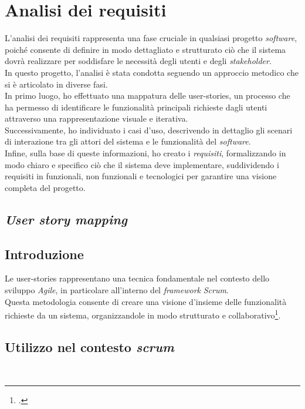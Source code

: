 \pagebreak
\section{Analisi dei requisiti}
\label{sez:analisi-dei-requisiti}
L’analisi dei requisiti rappresenta una fase cruciale in qualsiasi progetto \textit{software}, poiché consente di definire in modo dettagliato e strutturato ciò che il sistema dovrà realizzare per soddisfare le necessità degli utenti e degli \textit{stakeholder}.\\
In questo progetto, l’analisi è stata condotta seguendo un approccio metodico che si è articolato in diverse fasi.\\

\noindent In primo luogo, ho effettuato una mappatura delle \gls{user-stories}, un processo che ha permesso di identificare le funzionalità principali richieste dagli utenti attraverso una rappresentazione visuale e iterativa. \\
Successivamente, ho individuato i casi d’uso, descrivendo in dettaglio gli scenari di interazione tra gli attori del sistema e le funzionalità del \textit{software}.\\
Infine, sulla base di queste informazioni, ho creato i \textit{requisiti}, formalizzando in modo chiaro e specifico ciò che il sistema deve implementare, suddividendo i requisiti in funzionali, non funzionali e tecnologici per garantire una visione completa del progetto.
\subsection{\textit{User story mapping}}
\label{subsec:user-story-mapping}

\subsection*{Introduzione}
\label{subsubsec:introduzione}

Le \gls{user-stories} rappresentano una tecnica fondamentale nel contesto dello sviluppo \textit{Agile}, in particolare all'interno del \textit{framework} \textit{Scrum}. \\
Questa metodologia consente di creare una visione d'insieme delle funzionalità richieste da un sistema, organizzandole in modo strutturato e collaborativo\footcite{site:user-stories}. \\

\subsection*{Utilizzo nel contesto \textit{scrum}}\\

